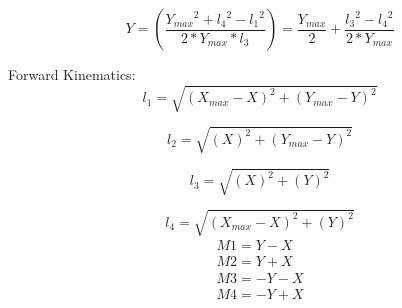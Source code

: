 \documentclass{article}
\begin{document}
\begin{equation}
Y = \left(\frac{Y_{max}{}^2 + l_4{}^2 - l_1{}^2}{2*Y_{max}*l_3}\right) = \frac{Y_{max}}{2} + \frac{l_3{}^2 - l_4{}^2}{2*Y_{max}}
\end{equation}

Forward Kinematics:
\begin{equation}
l_1 = \sqrt{\left(X_{max}-X\right)^2 + \left(Y_{max}-Y\right)^2}
\end{equation}

\begin{equation}
l_2 = \sqrt{\left(X\right)^2 + \left(Y_{max}-Y\right)^2}
\end{equation}

\begin{equation}
l_3 = \sqrt{\left(X\right)^2 + \left(Y\right)^2}
\end{equation}

\begin{equation}
l_4 = \sqrt{\left(X_{max}-X\right)^2 + \left(Y\right)^2}
\end{equation}
\newpage
\begin{equation}
\begin{aligned}
M1 = Y - X \\
M2 = Y + X\\
M3 = -Y -X\\
M4 = -Y + X\\
\end{aligned}
\end{equation}
\end{document}
